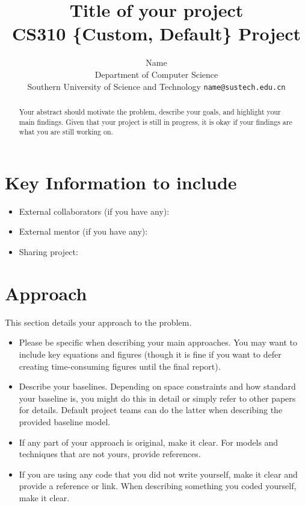 \documentclass{article}
\title{
  Title of your project \\
  \vspace{1em}
  \small{\normalfont CS310  \{Custom, Default\} Project}  %
}
\author{
  Name \\
  Department of Computer Science \\
  Southern University of Science and Technology
  \texttt{name@sustech.edu.cn} \\
}
\begin{document}
\maketitle

\begin{abstract}
  Your abstract should motivate the problem, describe your goals, and highlight your main findings. Given that your project is still in progress, it is okay if your findings are what you are still working on.
\end{abstract}


\section{Key Information to include}
\begin{itemize}
    \item External collaborators (if you have any):
    \item External mentor (if you have any):
    \item Sharing project:
\end{itemize}


\section{Approach}
This section details your approach to the problem. 
\begin{itemize}
    \item Please be specific when describing your main approaches. You may want to include key equations and figures (though it is fine if you want to defer creating time-consuming figures until the final report).
    \item Describe your baselines. Depending on space constraints and how standard your baseline is, you might do this in detail or simply refer to other papers for details. Default project teams can do the latter when describing the provided baseline model.
    \item If any part of your approach is original, make it clear. For models and techniques that are not yours, provide references.
    \item If you are using any code that you did not write yourself, make it clear and provide a reference or link. 
    When describing something you coded yourself, make it clear.
\end{itemize} 
\end{document}
